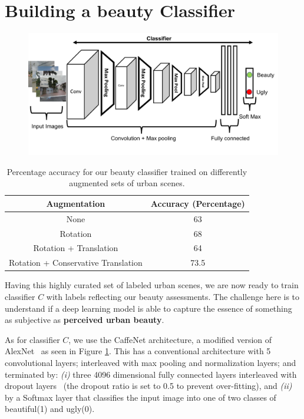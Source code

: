 \section{Building a beauty Classifier}

\begin{figure}[t!]
    \centering
    \includegraphics[width=\columnwidth]{Classifier_arch.pdf}
    \caption{}
    \label{fig:classifier_arch}
\end{figure}

\label{sec:framework}
\begin{table}[ht!]
    \centering
    \begin{tabular}{|c|c|}
        \hline
        \textbf{Augmentation} & \textbf{Accuracy (Percentage)}\\
        \hline
        None & 63 \\
        \hline
        Rotation  & 68 \\
        \hline
        Rotation + Translation  & 64 \\
        \hline
        Rotation + Conservative Translation & 73.5 \\
        \hline
    \end{tabular}
    \caption{Percentage accuracy for our beauty classifier trained on differently augmented sets of  urban scenes.}
    \label{tab:classifier}
    \vspace{-10mm}
\end{table}

Having this highly curated set of labeled urban scenes, we are now ready to train classifier $C$ with labels reflecting our beauty assessments. The challenge here is to understand if a deep learning model is able to capture the essence of something as subjective as \textbf{perceived urban beauty}.

As for classifier $C$, we use the CaffeNet architecture, a modified version of AlexNet~\cite{krizhevsky2012imagenet,szegedy2015going} as seen in Figure \ref{fig:classifier_arch}. This has a conventional architecture with 5 convolutional layers; interleaved with  max pooling and normalization layers; and terminated by: \emph{(i)} three 4096 dimensional fully connected layers interleaved with dropout layers~\cite{srivastava2014dropout} (the dropout ratio is set to 0.5 to prevent over-fitting), and \emph{(ii)} by a Softmax layer that classifies the input image into one of two classes of beautiful(1) and ugly(0).  

